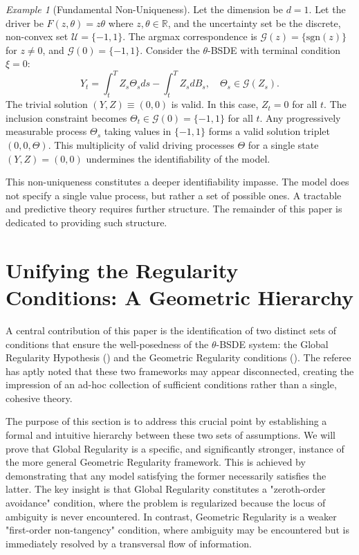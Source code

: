 \documentclass[12pt, letterpaper]{amsart}
\newcommand{\Ucal}{\mathcal{U}}
\newcommand{\R}{\mathbb{R}}
\theoremstyle{plain}
\theoremstyle{definition}
\theoremstyle{remark}
\newtheorem{example}[theorem]{Example}
\numberwithin{equation}{section} %
\begin{document}
\begin{example}[Fundamental Non-Uniqueness]
\label{ex:non_uniqueness}
Let the dimension be $d=1$. Let the driver be $F(z,\theta) = z\theta$ where $z, \theta \in \R$, and the uncertainty set be the discrete, non-convex set $\Ucal = \{-1, 1\}$. The argmax correspondence is $\mathcal{G}(z) = \{\text{sgn}(z)\}$ for $z \neq 0$, and $\mathcal{G}(0) = \{-1,1\}$.
Consider the $\theta$-BSDE with terminal condition $\xi=0$:
\[ Y_t = \int_t^T Z_s \Theta_s ds - \int_t^T Z_s dB_s, \quad \Theta_s \in \mathcal{G}(Z_s). \]
The trivial solution $(Y,Z) \equiv (0,0)$ is valid. In this case, $Z_t=0$ for all $t$. The inclusion constraint becomes $\Theta_t \in \mathcal{G}(0) = \{-1,1\}$ for all $t$. Any progressively measurable process $\Theta_s$ taking values in $\{-1,1\}$ forms a valid solution triplet $(0,0,\Theta)$. This multiplicity of valid driving processes $\Theta$ for a single state $(Y,Z)=(0,0)$ undermines the identifiability of the model.
\end{example}

This non-uniqueness constitutes a deeper identifiability impasse. The model does not specify a single value process, but rather a set of possible ones. A tractable and predictive theory requires further structure. The remainder of this paper is dedicated to providing such structure.

\section*{Unifying the Regularity Conditions: A Geometric Hierarchy}
\label{sec:unifying_conditions}

A central contribution of this paper is the identification of two distinct sets of conditions that ensure the well-posedness of the \(\theta\)-BSDE system: the Global Regularity Hypothesis () and the Geometric Regularity conditions (). The referee has aptly noted that these two frameworks may appear disconnected, creating the impression of an ad-hoc collection of sufficient conditions rather than a single, cohesive theory.

The purpose of this section is to address this crucial point by establishing a formal and intuitive hierarchy between these two sets of assumptions. We will prove that Global Regularity is a specific, and significantly stronger, instance of the more general Geometric Regularity framework. This is achieved by demonstrating that any model satisfying the former necessarily satisfies the latter. The key insight is that Global Regularity constitutes a "zeroth-order avoidance" condition, where the problem is regularized because the locus of ambiguity is never encountered. In contrast, Geometric Regularity is a weaker "first-order non-tangency" condition, where ambiguity may be encountered but is immediately resolved by a transversal flow of information.
\end{document}
